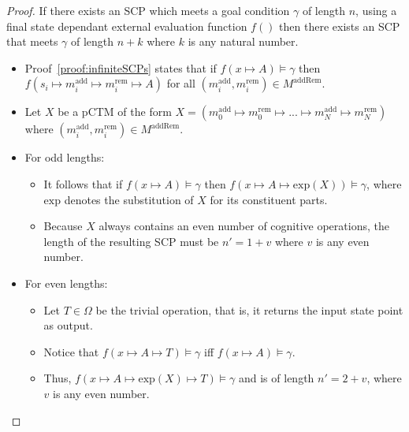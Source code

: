 \begin{proof} \label{proof:infiniteSCPLength}
If there exists an SCP which meets a goal condition $\gamma$ of length $n$, using a final state dependant external evaluation function $f()$ then there exists an SCP that meets $\gamma$ of length $n+k$ where $k$ is any natural number.
\begin{itemize}

\item Proof~\ref{proof:infiniteSCPs} states that if $f(x \longmapsto A)\models \gamma$ then $f(s_i \longmapsto m^\text{add}_i \longmapsto m^\text{rem}_i \longmapsto A)$ for all $(m^\text{add}_i, m^\text{rem}_i) \in M^\text{addRem}$.
\item Let $X$ be a pCTM of the form $X=(m^\text{add}_0 \longmapsto m^\text{rem}_0 \longmapsto ... \longmapsto m^\text{add}_N \longmapsto m^\text{rem}_{N})$ where $(m^\text{add}_i, m^\text{rem}_i) \in M^\text{addRem}$.
\item For odd lengths:
\begin{itemize}
\item  It follows that if $f(x \longmapsto A)\models \gamma$ then $f(x \longmapsto A \longmapsto \textrm{exp}(X))\models \gamma$, where $\textrm{exp}$ denotes the substitution of $X$ for its constituent parts.
\item Because $X$ always contains an even number of cognitive operations, the length of the resulting SCP must be $n' = 1+v$ where $v$ is any even number.
\end{itemize}
\item For even lengths:
\begin{itemize}
\item Let $T \in \Omega$ be the trivial operation, that is, it returns the input state point as output.
\item Notice that $f(x \longmapsto A \longmapsto T) \models \gamma$ iff $f(x \longmapsto A) \models \gamma$.
\item Thus, $f(x \longmapsto A \longmapsto \textrm{exp}(X) \longmapsto T )\models \gamma$ and is of length $n' = 2+v$, where $v$ is any even number.
\end{itemize}
\end{itemize}

\end{proof}

